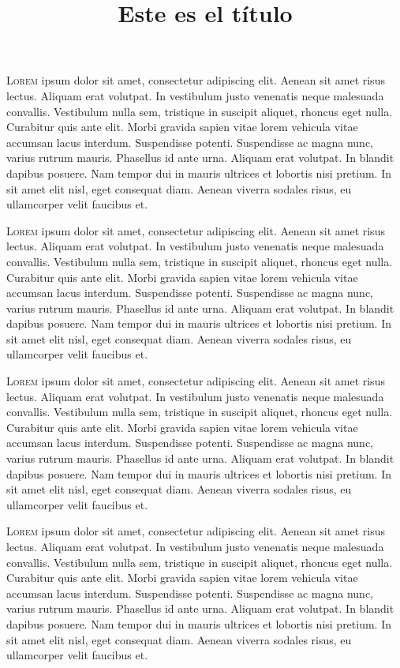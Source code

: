 \documentclass[12pt,notitlepage,onepage]{article}
\title{Este es el título}
\author{}
\date{}
\newcommand{\trapsA}[4]{
	\lettrine[lines=4, nindent=2pt, depth=#1, lraise=#2]
		{\fontspec{EB Garamond Initials}\color{Red}#3}{\color{Sepia}#4}
	}
\newcommand{\trapsB}[3]{
	\lettrine[lines=4, nindent=0em, depth=#1]
		{\fontspec{Adler}\color{Red}#2}{\fontspec{Adler}\color{Sepia}#3}
	}
\begin{document}
\lettrine{L}{orem} ipsum dolor sit amet, consectetur adipiscing elit. Aenean sit amet risus lectus. Aliquam erat volutpat. In vestibulum justo venenatis neque malesuada convallis. Vestibulum nulla sem, tristique in suscipit aliquet, rhoncus eget nulla. Curabitur quis ante elit. Morbi gravida sapien vitae lorem vehicula vitae accumsan lacus interdum. Suspendisse potenti. Suspendisse ac magna nunc, varius rutrum mauris. Phasellus id ante urna. Aliquam erat volutpat. In blandit dapibus posuere. Nam tempor dui in mauris ultrices et lobortis nisi pretium. In sit amet elit nisl, eget consequat diam. Aenean viverra sodales risus, eu ullamcorper velit faucibus et.

\trapsA{1}{0.085}{L}{orem} ipsum dolor sit amet, consectetur adipiscing elit. Aenean sit amet risus lectus. Aliquam erat volutpat. In vestibulum justo venenatis neque malesuada convallis. Vestibulum nulla sem, tristique in suscipit aliquet, rhoncus eget nulla. Curabitur quis ante elit. Morbi gravida sapien vitae lorem vehicula vitae accumsan lacus interdum. Suspendisse potenti. Suspendisse ac magna nunc, varius rutrum mauris. Phasellus id ante urna. Aliquam erat volutpat. In blandit dapibus posuere. Nam tempor dui in mauris ultrices et lobortis nisi pretium. In sit amet elit nisl, eget consequat diam. Aenean viverra sodales risus, eu ullamcorper velit faucibus et.

\trapsB{0}{L}{orem} ipsum dolor sit amet, consectetur adipiscing elit. Aenean sit amet risus lectus. Aliquam erat volutpat. In vestibulum justo venenatis neque malesuada convallis. Vestibulum nulla sem, tristique in suscipit aliquet, rhoncus eget nulla. Curabitur quis ante elit. Morbi gravida sapien vitae lorem vehicula vitae accumsan lacus interdum. Suspendisse potenti. Suspendisse ac magna nunc, varius rutrum mauris. Phasellus id ante urna. Aliquam erat volutpat. In blandit dapibus posuere. Nam tempor dui in mauris ultrices et lobortis nisi pretium. In sit amet elit nisl, eget consequat diam. Aenean viverra sodales risus, eu ullamcorper velit faucibus et.

\trapsB{0}{L}{orem} {ipsum dolor sit amet, consectetur adipiscing elit. Aenean sit amet risus lectus. Aliquam erat volutpat. In vestibulum justo venenatis neque malesuada convallis. Vestibulum nulla sem, tristique in suscipit aliquet, rhoncus eget nulla. Curabitur quis ante elit. Morbi gravida sapien vitae lorem vehicula vitae accumsan lacus interdum. Suspendisse potenti. Suspendisse ac magna nunc, varius rutrum mauris. Phasellus id ante urna. Aliquam erat volutpat. In blandit dapibus posuere. Nam tempor dui in mauris ultrices et lobortis nisi pretium. In sit amet elit nisl, eget consequat diam. Aenean viverra sodales risus, eu ullamcorper velit faucibus et.
	}
\end{document}
